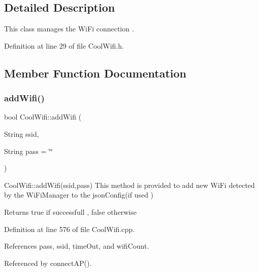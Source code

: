 \subsection{Detailed Description}
This class manages the Wi\+Fi connection . 

Definition at line 29 of file Cool\+Wifi.\+h.



\subsection{Member Function Documentation}
\mbox{\label{classCoolWifi_a914d7a1df14dd6b75345fb614c34e9d6}} 
\subsubsection{\texorpdfstring{add\+Wifi()}{addWifi()}}
{\footnotesize\ttfamily bool Cool\+Wifi\+::add\+Wifi (\begin{DoxyParamCaption}\item[{String}]{ssid,  }\item[{String}]{pass = {\ttfamily \char`\"{}\char`\"{}} }\end{DoxyParamCaption})}

Cool\+Wifi\+::add\+Wifi(ssid,pass) This method is provided to add new Wi\+Fi detected by the Wi\+Fi\+Manager to the json\+Config(if used )

\begin{DoxyReturn}{Returns}
true if successfull , false otherwise 
\end{DoxyReturn}


Definition at line 576 of file Cool\+Wifi.\+cpp.



References pass, ssid, time\+Out, and wifi\+Count.



Referenced by connect\+A\+P().


